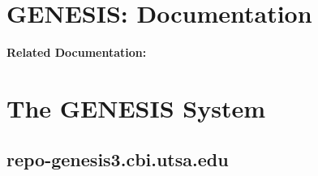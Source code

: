 \documentclass[12pt]{article}
\begin{document}
\section*{GENESIS: Documentation}

{\bf Related Documentation:}

\section*{The GENESIS System}

\subsection*{\bf repo-genesis3.cbi.utsa.edu}
\end{document}

